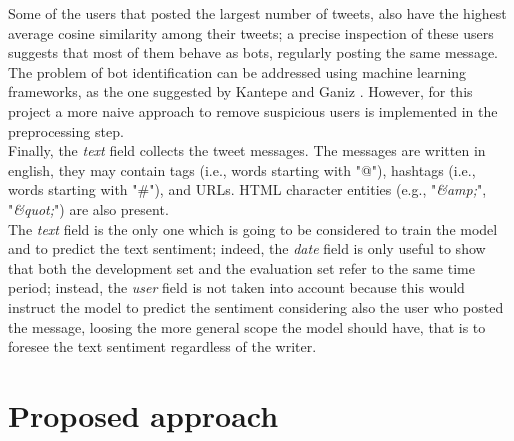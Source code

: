 \documentclass[conference]{IEEEtran}
\begin{document}
Some of the users that posted the largest number of tweets, also have the highest average cosine similarity among their tweets; a precise inspection of these users suggests that most of them behave as bots, regularly posting the same message. The problem of bot identification can be addressed using machine learning frameworks, as the one suggested by Kantepe and Ganiz \cite{8093483}. However, for this project a more naive approach to remove suspicious users is implemented in the preprocessing step. \\
Finally, the \textit{text} field collects the tweet messages. The messages are written in english, they may contain tags (i.e., words starting with "@"), hashtags (i.e., words starting with "\#"), and URLs. HTML character entities (e.g., "\textit{\&amp;}", "\textit{\&quot;}") are also present. \\
The \textit{text} field is the only one which is going to be considered to train the model and to predict the text sentiment; indeed, the \textit{date} field is only useful to show that both the development set and the evaluation set refer to the same time period; instead, the \textit{user} field is not taken into account because this would instruct the model to predict the sentiment considering also the user who posted the message, loosing the more general scope the model should have, that is to foresee the text sentiment regardless of the writer. 

\section{Proposed approach}
\end{document}
